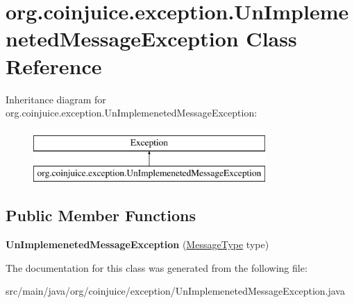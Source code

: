 \hypertarget{classorg_1_1coinjuice_1_1exception_1_1_un_implemeneted_message_exception}{\section{org.\-coinjuice.\-exception.\-Un\-Implemeneted\-Message\-Exception Class Reference}
\label{classorg_1_1coinjuice_1_1exception_1_1_un_implemeneted_message_exception}
}
Inheritance diagram for org.\-coinjuice.\-exception.\-Un\-Implemeneted\-Message\-Exception\-:\begin{figure}[H]
\begin{center}
\leavevmode
\includegraphics[height=2.000000cm]{classorg_1_1coinjuice_1_1exception_1_1_un_implemeneted_message_exception}
\end{center}
\end{figure}
\subsection*{Public Member Functions}
\begin{DoxyCompactItemize}
\item 
\hypertarget{classorg_1_1coinjuice_1_1exception_1_1_un_implemeneted_message_exception_a788167e74a47c1a86d4cf95bd39f3cbb}{{\bfseries Un\-Implemeneted\-Message\-Exception} (\hyperlink{enumorg_1_1coinjuice_1_1message_1_1_message_type}{Message\-Type} type)}\label{classorg_1_1coinjuice_1_1exception_1_1_un_implemeneted_message_exception_a788167e74a47c1a86d4cf95bd39f3cbb}

\end{DoxyCompactItemize}


The documentation for this class was generated from the following file\-:\begin{DoxyCompactItemize}
\item 
src/main/java/org/coinjuice/exception/Un\-Implemeneted\-Message\-Exception.\-java\end{DoxyCompactItemize}
